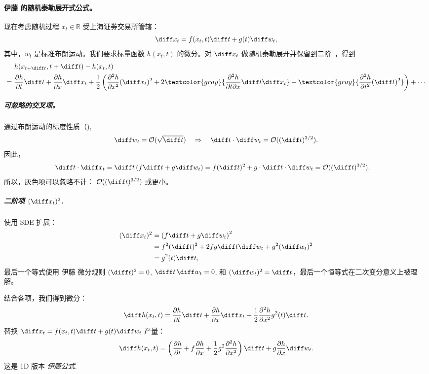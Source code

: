 \paragraph{伊藤 的随机泰勒展开式公式。}
现在考虑随机过程 $x_t \in \mathbb{R}$ 受上海证券交易所管辖：
\[
\diff x_t = f(x_t, t) \diff t + g(t) \diff w_t,
\]
其中，$w_t$ 是标准布朗运动。我们要求标量函数 $h(x_t, t)$ 的微分。对 $\diff x_t$ 做随机泰勒展开并保留到二阶~\citep{kloeden1992stochastic}，得到
\begin{align*}
&h(x_{t+\diff t}, t+\diff t)
- h(x_t, t) \\
=~&\frac{\partial h}{\partial t} \diff t
+ \frac{\partial h}{\partial x} \diff x_t
+ \frac{1}{2} \left( \frac{\partial^2 h}{\partial x^2} (\diff x_t)^2
+ 2\textcolor{gray}{{\frac{\partial^2 h}{\partial t \partial x} \diff t \diff x_t}}
+ \textcolor{gray}{{ \frac{\partial^2 h}{\partial t^2} (\diff t)^2}} \right)
+ \cdots
\end{align*}
\subparagraph{可忽略的交叉项。}
通过布朗运动的标度性质（),
\[
\diff w_t = \mathcal{O}(\sqrt{\diff t}) \quad \Rightarrow \quad \diff t \cdot \diff w_t = \mathcal{O}((\diff t)^{3/2}).
\]
因此，
\begin{align*}
\diff t \cdot \diff x_t
&= \diff t \left(f \diff t + g \diff w_t\right)
= f (\diff t)^2 + g \cdot \diff t \cdot \diff w_t
= \mathcal{O}((\diff t)^{3/2}).
\end{align*}
所以，灰色项可以忽略不计： $ \mathcal{O}((\diff t)^{3/2}) $ 或更小。
\subparagraph{二阶项 $(\diff x_t)^2$.}
使用 SDE 扩展：
\begin{align*}
(\diff x_t)^2
&= \left( f \diff t + g \diff w_t \right)^2 \\
&= f^2 (\diff t)^2 + 2fg \diff t \diff w_t + g^2 (\diff w_t)^2 \\
&= g^2(t) \diff t,
\end{align*}
最后一个等式使用 伊藤 微分规则
$(\diff t)^2=0$, $\diff t\,\diff w_t=0$, 和
$(\diff w_t)^2=\diff t$，最后一个恒等式在二次变分意义上被理解。

结合各项，我们得到微分：
\[
\diff h(x_t, t)
= \frac{\partial h}{\partial t} \diff t
+ \frac{\partial h}{\partial x} \diff x_t
+ \frac{1}{2} \frac{\partial^2 h}{\partial x^2} g^2(t) \diff t.
\]
替换 $ \diff x_t = f(x_t, t) \diff t + g(t) \diff w_t $ 产量：
\[
\diff h(x_t, t)
= \left( \frac{\partial h}{\partial t} + f \frac{\partial h}{\partial x}
+ \frac{1}{2} g^2 \frac{\partial^2 h}{\partial x^2} \right) \diff t
+ g \frac{\partial h}{\partial x} \diff w_t.
\]
这是 1D 版本 \emph{伊藤公式}.


